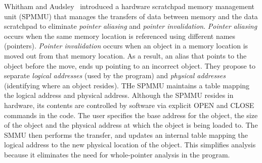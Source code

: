  
Whitham and Audsley~\cite{whitham:09:timepredLoadStore} introduced a hardware scratchpad memory management unit (SPMMU) that manages the transfers of data between memory and the data scratchpad to eliminate \emph{pointer aliasing} and \emph{pointer invalidation}.
\emph{Pointer aliasing} occurs when the same memory location is referenced using different names (pointers). 
\emph{Pointer invalidation} occurs when an object in a memory location is moved out from that memory location.  
As a result, an alias that points to the object before the move, ends up pointing to an incorrect object.
They propose to separate \emph{logical addresses} (used by the program) and \emph{physical addresses} (identifying where an object resides).  
THe SPMMU maintains a table mapping the logical address and physical address.   
Although the SPMMU resides in hardware, its contents are controlled by software via explicit OPEN and CLOSE commands in the code.  
The user specifies the base address for the object, the size of the object and the physical address at which the object is being loaded to. 
The SMMU then performs the transfer, and updates an internal table mapping the logical address to the new physical location of the object.  
This simplifies analysis because it eliminates the need for whole-pointer analysis in the program. 

